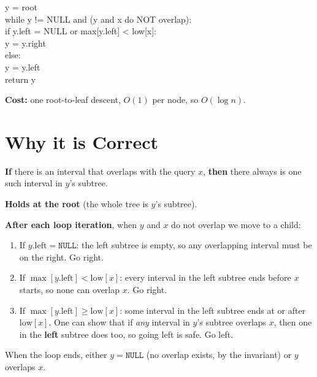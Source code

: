 \documentclass[11pt]{article}
\begin{document}
\begin{codebox}
\ttfamily y = root\\
\ttfamily while y != NULL and (y and x do NOT overlap):\\
\ttfamily \hspace*{2em}if y.left = NULL or max[y.left] < low[x]:\\
\ttfamily \hspace*{4em}y = y.right\\
\ttfamily \hspace*{2em}else:\\
\ttfamily \hspace*{4em}y = y.left\\
\ttfamily return y
\end{codebox}

\textbf{Cost:} one root-to-leaf descent, $O(1)$ per node, so \textcolor{greenO}{$O(\log n)$}.

\section{Why it is Correct}

\begin{keybox}
\textbf{If} there is an interval that overlaps with the query $x$, \textbf{then} there always is one such interval in $y$'s subtree.
\end{keybox}

\begin{keybox}
\textbf{Holds at the root} (the whole tree is $y$'s subtree).

\textbf{After each loop iteration}, when $y$ and $x$ do not overlap we move to a child:
\begin{enumerate}[leftmargin=1.6em,itemsep=2pt]
  \item[(i)] If $y.\text{left} = \texttt{NULL}$: the left subtree is empty, so any overlapping interval must be on the right. Go right. \textcolor{greenO}{\checkmark}
  \item[(ii)] If $\max[y.\text{left}] < \text{low}[x]$: every interval in the left subtree ends before $x$ starts, so none can overlap $x$. Go right. \textcolor{greenO}{\checkmark}
  \item[(iii)] If $\max[y.\text{left}] \ge \text{low}[x]$: some interval in the left subtree ends at or after $\text{low}[x]$. One can show that if \emph{any} interval in $y$'s subtree overlaps $x$, then one in the \textbf{left} subtree does too, so going left is safe. Go left. \textcolor{greenO}{\checkmark}
\end{enumerate}
When the loop ends, either $y = \texttt{NULL}$ (no overlap exists, by the invariant) or $y$ overlaps $x$.
\end{keybox}
\end{document}
